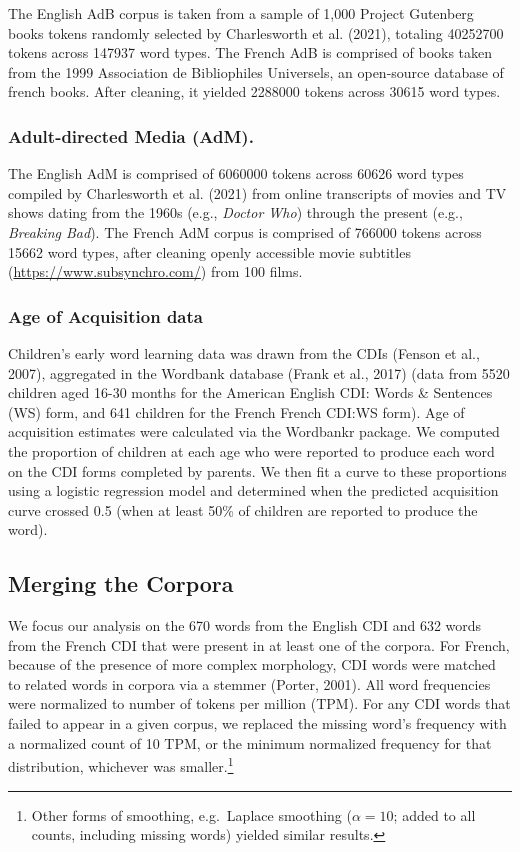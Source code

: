 \documentclass[10pt, letterpaper]{article}
\begin{document}
The English AdB corpus is taken from a sample of 1,000 Project Gutenberg
books tokens randomly selected by Charlesworth et al. (2021), totaling
40252700 tokens across 147937 word types. The French AdB is comprised of
books taken from the 1999 Association de Bibliophiles Universels, an
open-source database of french books. After cleaning, it yielded 2288000
tokens across 30615 word types.

\hypertarget{adult-directed-media-adm.}{%
\subsubsection{Adult-directed Media
(AdM).}\label{adult-directed-media-adm.}}

The English AdM is comprised of 6060000 tokens across 60626 word types
compiled by Charlesworth et al. (2021) from online transcripts of movies
and TV shows dating from the 1960s (e.g., \emph{Doctor Who}) through the
present (e.g., \emph{Breaking Bad}). The French AdM corpus is comprised
of 766000 tokens across 15662 word types, after cleaning openly
accessible movie subtitles (\url{https://www.subsynchro.com/}) from 100
films.

\hypertarget{age-of-acquisition-data}{%
\subsubsection{Age of Acquisition data}\label{age-of-acquisition-data}}

Children's early word learning data was drawn from the CDIs (Fenson et
al., 2007), aggregated in the Wordbank database (Frank et al., 2017)
(data from 5520 children aged 16-30 months for the American English CDI:
Words \& Sentences (WS) form, and 641 children for the French French
CDI:WS form). Age of acquisition estimates were calculated via the
Wordbankr package. We computed the proportion of children at each age
who were reported to produce each word on the CDI forms completed by
parents. We then fit a curve to these proportions using a logistic
regression model and determined when the predicted acquisition curve
crossed 0.5 (when at least 50\% of children are reported to produce the
word).

\hypertarget{merging-the-corpora}{%
\subsection{Merging the Corpora}\label{merging-the-corpora}}

We focus our analysis on the 670 words from the English CDI and 632
words from the French CDI that were present in at least one of the
corpora. For French, because of the presence of more complex morphology,
CDI words were matched to related words in corpora via a stemmer
(Porter, 2001). All word frequencies were normalized to number of tokens
per million (TPM). For any CDI words that failed to appear in a given
corpus, we replaced the missing word's frequency with a normalized count
of 10 TPM, or the minimum normalized frequency for that distribution,
whichever was smaller.\footnote{Other forms of smoothing, e.g.~Laplace
  smoothing (\(\alpha=10\); added to all counts, including missing
  words) yielded similar results.}
\end{document}
